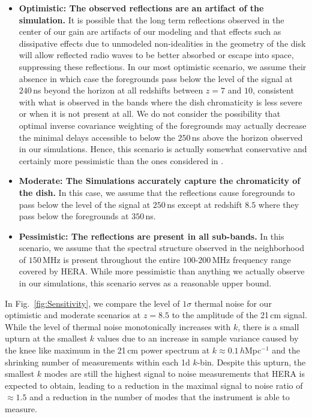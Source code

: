 \documentclass[twocolumn]{emulateapj}
\begin{document}
\begin{itemize}
\item {\bf Optimistic: The observed reflections are an artifact of the simulation.} It is possible that the long term reflections observed in the center of our gain are artifacts of our modeling and that effects such as dissipative effects due to unmodeled non-idealities in the geometry of the disk will allow reflected radio waves to be better absorbed or escape into space, suppressing these reflections. In our most optimistic scenario, we assume their absence in which case the foregrounds pass below the level of the signal at $240$\,ns beyond the horizon at all redshifts between $z=7$ and $10$, consistent with what is observed in the bands where the dish chromaticity is less severe or when it is not present at all. We do not consider the possibility that optimal inverse covariance weighting of the foregrounds  may actually decrease the minimal delays accessible to below the $250$\,ns above the horizon observed in our simulations. Hence, this scenario is actually somewhat conservative and certainly more pessimistic than the ones considered in \citep{Pober:2014,Greig:2015a,EwallWice:2015b}. 
 
\item {\bf Moderate: The Simulations accurately capture the chromaticity of the dish.} In this case, we assume that the reflections cause foregrounds to pass below the level of the signal at $250$\,ns except at redshift $8.5$ where they pass below the foregrounds at $350$\,ns. 


\item {\bf Pessimistic: The reflections are present in all sub-bands.} In this scenario, we assume that the spectral structure observed in the neighborhood of $150$\,MHz is present throughout the entire $100$-$200$\,MHz frequency range covered by HERA. While more pessimistic than anything we actually observe in our simulations, this scenario serves as a reasonable upper bound.
 
\end{itemize}
In Fig.~\ref{fig:Sensitivity}, we compare the level of $1\sigma$ thermal noise for our optimistic and moderate scenarios at $z=8.5$ to the amplitude of the 21\,cm signal. While the level of thermal noise monotonically increases with $k$, there is a small upturn at the smallest $k$ values due to an increase in sample variance caused by the knee like maximum in the 21\,cm power spectrum at $k \approx 0.1$\,$h$Mpc$^{-1}$ and the shrinking number of measurements within each 1d $k$-bin. Despite this upturn, the smallest $k$ modes are still the highest signal to noise measurements that HERA is expected to obtain, leading to a reduction in the maximal signal to noise ratio of $\approx 1.5$ and a reduction in the number of modes that the instrument is able to measure. 
\end{document}
